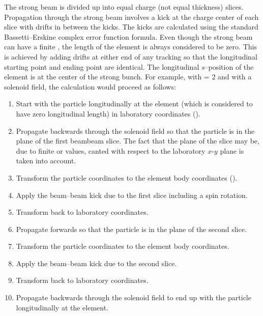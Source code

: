 The strong beam is divided up into  equal charge (not equal thickness) slices.
Propagation through the strong beam involves a kick at the charge center of each slice with drifts
in between the kicks. The kicks are calculated using the standard Bassetti--Erskine complex error
function formula\cite{b:talman}.  Even though the strong beam can have a finite , the
length of the element is always considered to be zero. This is achieved by adding drifts at either
end of any tracking so that the longitudinal starting point and ending point are identical. The
longitudinal $s$--position of the  element is at the center of the strong bunch. For
example, with  = 2 and with a solenoid field, the calculation would proceed as follows:
\begin{enumerate}
  \item 
Start with the particle longitudinally at the  element (which is considered to have
zero longitudinal length) in laboratory coordinates ().
  \item
Propagate backwards through the solenoid field so that the particle is in the plane of the first
beambeam slice. The fact that the plane of the slice may be, due to finite  or
 values, canted with respect to the laboratory $x$-$y$ plane is taken into account.
  \item
Transform the particle coordinates to the  element body coordinates
().
  \item
Apply the beam--beam kick due to the first slice including a spin rotation.
  \item
Transform back to laboratory coordinates.
  \item
Propagate forwards so that the particle is in the plane of the second slice.
  \item
Transform the particle coordinates to the  element body coordinates.
  \item 
Apply the beam--beam kick due to the second slice.
  \item 
Transform back to laboratory coordinates.
  \item 
Propagate backwards through the solenoid field to end up with the particle longitudinally at the
 element.
\end{enumerate}

